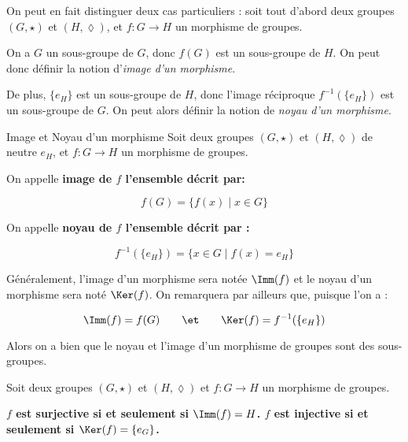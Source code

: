 \documentclass[a4paper,french,bookmarks]{article}
\begin{document}
On peut en fait distinguer deux cas particuliers : soit tout d'abord deux groupes $(G, \star)$ et $(H, \lozenge)$, et $f: G \to H$ un morphisme de groupes.

\begin{enumerate}
    \ithand On a $G$ un sous-groupe de $G$, donc $f(G)$ est un sous-groupe de $H$. On peut donc définir la notion d'\textit{image d'un morphisme}.
    
    \ithand De plus, $\{e_H\}$ est un sous-groupe de $H$, donc l'image réciproque $f^{-1}(\{e_H\})$ est un sous-groupe de $G$. On peut alors définir la notion de \textit{noyau d'un morphisme}.
\end{enumerate} 

\begin{definition}{Image et Noyau d'un morphisme}{}
    Soit deux groupes $(G, \star)$ et $(H, \lozenge)$ de neutre $e_H$, et $f: G \to H$ un morphisme de groupes.
    
    On appelle \bf{image de $f$} l'ensemble décrit par:
    
    \[ f(G) = \{f(x) \mid x \in G\}\]
    
    On appelle \bf{noyau de $f$} l'ensemble décrit par :
    
    \[ f^{-1}(\{e_H\}) = \{ x \in G \mid f(x) = e_H \} \]
\end{definition}

Généralement, l'image d'un morphisme sera notée $\Imm(f)$ et le noyau d'un morphisme sera noté $\Ker(f)$. On remarquera par ailleurs que, puisque l'on a :

\[\Imm(f) = f(G) \qquad\et\qquad \Ker(f) = f^{-1}(\{e_H\})\]

Alors on a bien que le noyau et l'image d'un morphisme de groupes sont des sous-groupes.

\begin{theorem}{}{}
     Soit deux groupes $(G, \star)$ et $(H, \lozenge)$ et $f: G \to H$ un morphisme de groupes.
     
     \begin{enumerate}
         \ithand \bf{$f$ est surjective si et seulement si $\Imm(f) = H$}.
         \ithand \bf{$f$ est injective si et seulement si $\Ker(f) = \{e_G\}$}.
     \end{enumerate}
      
\end{theorem}
\end{document}
